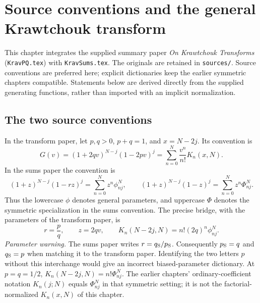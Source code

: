 \chapter{Source conventions and the general Krawtchouk transform}
\label{chap:pq-source-summary}
This chapter integrates the supplied summary paper \emph{On Krawtchouk
Transforms} (\texttt{KravPQ.tex}) with \texttt{KravSums.tex}.
The originals are retained in \texttt{sources/}. Source conventions are
preferred here; explicit dictionaries keep the earlier symmetric chapters
compatible. Statements below are derived directly from the supplied
generating functions, rather than imported with an implicit normalization.

\section{The two source conventions}
In the transform paper, let $p,q>0$, $p+q=1$, and $x=N-2j$. Its convention is
\begin{equation}\label{eq:pq-source-gf}
G(v)=(1+2qv)^{N-j}(1-2pv)^j
=\sum_{n=0}^N\frac{v^n}{n!}K_n(x,N).
\end{equation}
In the sums paper the convention is
\begin{equation*}
(1+z)^{N-j}(1-rz)^j=\sum_{n=0}^Nz^n\phi^N_{nj},
\qquad
(1+z)^{N-j}(1-z)^j=\sum_{n=0}^Nz^n\Phi^N_{nj}.
\end{equation*}
Thus the lowercase $\phi$ denotes general parameters, and uppercase
$\Phi$ denotes the symmetric specialization in the sums convention.
The precise bridge, with the parameters of the transform paper, is
\begin{equation}\label{eq:pq-source-dictionary}
r=\frac pq,\qquad z=2qv,\qquad
K_n(N-2j,N)=n!(2q)^n\phi^N_{nj}.
\end{equation}
\emph{Parameter warning.} The sums paper writes $r=q_{\rm S}/p_{\rm S}$.
Consequently $p_{\rm S}=q$ and $q_{\rm S}=p$ when matching it to the
transform paper. Identifying the two letters $p$ without this interchange
would give an incorrect biased-parameter dictionary.
At $p=q=1/2$, $K_n(N-2j,N)=n!\Phi^N_{nj}$.
The earlier chapters' ordinary-coefficient notation $K_n(j;N)$ equals
$\Phi^N_{nj}$ in that symmetric setting; it is not the factorial-normalized
$K_n(x,N)$ of this chapter.

